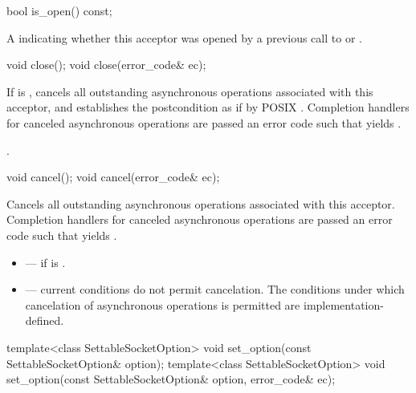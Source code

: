 \begin{itemdecl}
bool is_open() const;
\end{itemdecl}

\begin{itemdescr}
\pnum
\returns A  indicating whether this acceptor was opened by a previous call to  or .
\end{itemdescr}

\begin{itemdecl}
void close();
void close(error_code& ec);
\end{itemdecl}

\begin{itemdescr}
\pnum
\effects If  is , cancels all outstanding asynchronous operations associated with this acceptor, and establishes the postcondition as if by POSIX . Completion handlers for canceled asynchronous operations are passed an error code  such that  yields .

\pnum
\postconditions {}.
\end{itemdescr}

\begin{itemdecl}
void cancel();
void cancel(error_code& ec);
\end{itemdecl}

\begin{itemdescr}
\pnum
\effects Cancels all outstanding asynchronous operations associated with this acceptor. Completion handlers for canceled asynchronous operations are passed an error code  such that  yields .

\pnum
\errors
\begin{itemize}
\item
{} --- if  is .
\item
{} --- current conditions do not permit cancelation. The conditions under which cancelation of asynchronous operations is permitted are implementation-defined.
\end{itemize}
\end{itemdescr}

\begin{itemdecl}
template<class SettableSocketOption>
  void set_option(const SettableSocketOption& option);
template<class SettableSocketOption>
  void set_option(const SettableSocketOption& option, error_code& ec);
\end{itemdecl}

